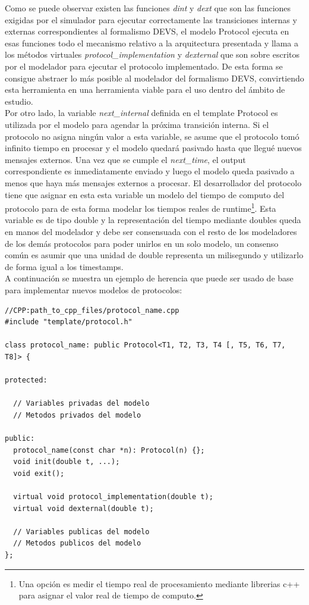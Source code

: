 \documentclass[10pt,a4paper]{article}
\begin{document}
Como se puede observar existen las funciones \textit{dint} y \textit{dext} que son las funciones exigidas por el simulador para ejecutar correctamente las transiciones internas y externas correspondientes al formalismo DEVS, el modelo Protocol ejecuta en esas funciones todo el mecanismo relativo a la arquitectura presentada y llama a los métodos virtuales \textit{protocol\_implementation} y \textit{dexternal} que son sobre escritos por el modelador para ejecutar el protocolo implementado. De esta forma se consigue abstraer lo más posible al modelador del formalismo DEVS, convirtiendo esta herramienta en una herramienta viable para el uso dentro del ámbito de estudio. \\

Por otro lado, la variable \textit{next\_internal} definida en el template Protocol es utilizada por el modelo para agendar la próxima transición interna. Si el protocolo no asigna ningún valor a esta variable, se asume que el protocolo tomó infinito tiempo en procesar y el modelo quedará pasivado hasta que llegué nuevos mensajes externos. Una vez que se cumple el \textit{next\_time}, el output correspondiente es inmediatamente enviado y luego el modelo queda pasivado a menos que haya más mensajes externos a procesar. El desarrollador del protocolo tiene que asignar en esta esta variable un modelo del tiempo de computo del protocolo para de esta forma modelar los tiempos reales de runtime\footnote{Una opción es medir el tiempo real de procesamiento mediante librerias c++ para asignar el valor real de tiempo de computo.}. Esta variable es de tipo double y la representación del tiempo mediante doubles queda en manos del modelador y debe ser consensuada con el resto de los modeladores de los demás protocolos para poder unirlos en un solo modelo, un consenso común es asumir que una unidad de double representa un milisegundo y utilizarlo de forma igual a los timestamps. \\

A continuación se muestra un ejemplo de herencia que puede ser usado de base para implementar nuevos modelos de protocolos: \\

\begin{lstlisting}
//CPP:path_to_cpp_files/protocol_name.cpp
#include "template/protocol.h"

class protocol_name: public Protocol<T1, T2, T3, T4 [, T5, T6, T7, T8]> { 

protected:
	
  // Variables privadas del modelo
  // Metodos privados del modelo

public:
  protocol_name(const char *n): Protocol(n) {};
  void init(double t, ...);
  void exit();

  virtual void protocol_implementation(double t);
  virtual void dexternal(double t);
  
  // Variables publicas del modelo
  // Metodos publicos del modelo
};
\end{lstlisting}
\end{document}
